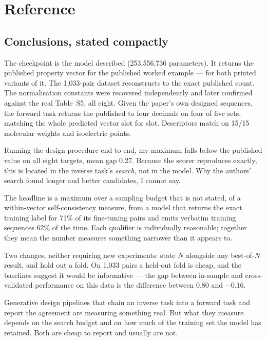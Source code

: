 \chapter{Reference}
\label{ch:reference}

\section{Conclusions, stated compactly}

\begin{description}[leftmargin=0cm,style=nextline,itemsep=6pt]

\item[What reproduces exactly.] The checkpoint is the model described
  (253{,}556{,}736 parameters). It returns the published property vector for the
  published worked example --- for both printed variants of it. The 1{,}033-pair
  dataset reconstructs to the exact published count. The normalisation constants
  were recovered independently and later confirmed against the real Table~S5,
  all eight. Given the paper's own designed sequences, the forward task returns
  the published \Rsq{} to four decimals on four of five sets, matching the whole
  predicted vector slot for slot. Descriptors match on 15/15 molecular weights
  and isoelectric points.

\item[What reproduces partially.] Running the design procedure end to end, my
  maximum falls below the published value on all eight targets, mean gap 0.27.
  Because the scorer reproduces exactly, this is located in the inverse task's
  \emph{search}, not in the model. Why the authors' search found longer and
  better candidates, I cannot say.

\item[What the numbers measure.] The headline \Rsq{} is a maximum over a
  sampling budget that is not stated, of a within-vector self-consistency
  measure, from a model that returns the exact training label for 71\% of its
  fine-tuning pairs and emits verbatim training sequences 62\% of the time.
  Each qualifier is individually reasonable; together they mean the number
  measures something narrower than it appears to.

\item[What would remove the ambiguity.] Two changes, neither requiring new
  experiments: state $N$ alongside any best-of-$N$ result, and hold out a fold.
  On 1{,}033 pairs a held-out fold is cheap, and the baselines suggest it would
  be informative --- the gap between in-sample and cross-validated performance on
  this data is the difference between 0.80 and $-0.16$.

\item[The wider point.] Generative design pipelines that chain an inverse task
  into a forward task and report the agreement are measuring something real.
  But what they measure depends on the search budget and on how much of the
  training set the model has retained. Both are cheap to report and usually are
  not.

\end{description}

